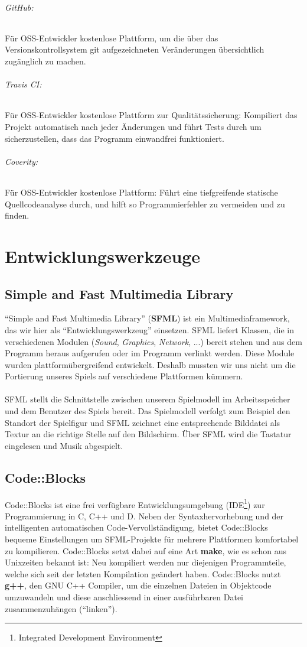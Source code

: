 \documentclass[11pt,a4paper]{scrbook}
\newcommand{\q}[1]{``#1''}
\begin{document}
\subparagraph{GitHub:}
Für OSS-Entwickler kostenlose Plattform, um die über das Versionskontrollsystem git aufgezeichneten Veränderungen übersichtlich zugänglich zu machen.

\subparagraph{Travis CI:}
Für OSS-Entwickler kostenlose Plattform zur Qualitätssicherung: Kompiliert das Projekt automatisch nach jeder Änderungen und führt Tests durch um sicherzustellen, dass das Programm einwandfrei funktioniert.

\subparagraph{Coverity:}
Für OSS-Entwickler kostenlose Plattform: Führt eine tiefgreifende statische Quellcodeanalyse durch, und hilft so Programmierfehler zu vermeiden und zu finden.

\chapter{Entwicklungswerkzeuge}
\section{Simple and Fast Multimedia Library}
\q{Simple and Fast Multimedia Library} (\textbf{SFML}) ist ein Multimediaframework, das wir hier als
\q{Entwicklungswerkzeug} einsetzen.
SFML liefert Klassen, die in verschiedenen Modulen (\textit{Sound}, \textit{Graphics}, \textit{Network}, ...) bereit stehen und aus dem Programm heraus aufgerufen oder im Programm verlinkt werden.
Diese Module wurden plattformübergreifend entwickelt. Deshalb mussten wir uns nicht um die Portierung unseres Spiels auf verschiedene Plattformen kümmern.
\\
\\
SFML stellt die Schnittstelle zwischen unserem Spielmodell im Arbeitsspeicher und dem Benutzer des Spiels bereit. Das Spielmodell verfolgt zum Beispiel den Standort der Spielfigur und SFML zeichnet eine entsprechende Bilddatei als Textur an die richtige Stelle auf den Bildschirm. Über SFML wird die Tastatur eingelesen und Musik abgespielt.

\section{Code::Blocks}
Code::Blocks ist eine frei verfügbare Entwicklungsumgebung (IDE\footnote{Integrated Development Environment}) zur Programmierung in C, C++ und D.
Neben der Syntaxhervorhebung und der intelligenten automatischen Code-Vervollständigung, bietet Code::Blocks bequeme Einstellungen um SFML-Projekte für mehrere Plattformen
komfortabel zu kompilieren. Code::Blocks setzt dabei auf eine Art \textbf{make}, wie es schon aus Unixzeiten bekannt ist: Neu kompiliert werden nur diejenigen Programmteile, welche sich
seit der letzten Kompilation geändert haben. Code::Blocks nutzt \textbf{g++}, den GNU C++ Compiler, um die einzelnen Dateien in Objektcode umzuwandeln und diese
anschliessend in einer ausführbaren Datei zusammenzuhängen (\q{linken}).
\end{document}
